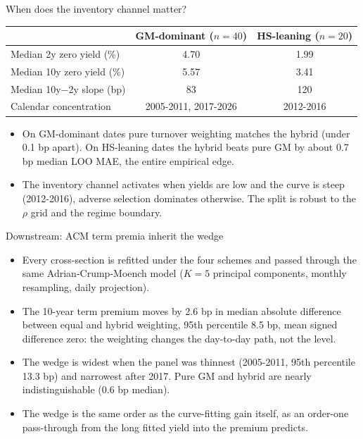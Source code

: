 \documentclass[aspectratio=169,11pt]{beamer}
\begin{document}
\begin{frame}{When does the inventory channel matter?}
  \begin{center}
  \small
  \begin{tabular}{lcc}
  \toprule
  & GM-dominant ($n=40$) & HS-leaning ($n=20$) \\
  \midrule
  Median 2y zero yield (\%)   & 4.70 & 1.99 \\
  Median 10y zero yield (\%)  & 5.57 & 3.41 \\
  Median 10y$-$2y slope (bp)  & 83   & 120  \\
  Calendar concentration      & 2005-2011, 2017-2026 & 2012-2016 \\
  \bottomrule
  \end{tabular}
  \end{center}
  \vspace{2mm}
  \begin{itemize}
    \item On GM-dominant dates pure turnover weighting matches the hybrid
          (under 0.1 bp apart). On HS-leaning dates the hybrid beats pure GM
          by about 0.7 bp median LOO MAE, the entire empirical edge.
    \item The inventory channel activates when yields are low and the curve
          is steep (2012-2016), adverse selection dominates otherwise. The
          split is robust to the $\rho$ grid and the regime boundary.
  \end{itemize}
\end{frame}

\begin{frame}{Downstream: ACM term premia inherit the wedge}
  \begin{itemize}
    \item Every cross-section is refitted under the four schemes and passed
          through the same Adrian-Crump-Moench model ($K=5$ principal
          components, monthly resampling, daily projection).
    \item The 10-year term premium moves by 2.6 bp in median absolute
          difference between equal and hybrid weighting, 95th percentile
          8.5 bp, mean signed difference zero: the weighting changes the
          day-to-day path, not the level.
    \item The wedge is widest when the panel was thinnest (2005-2011, 95th
          percentile 13.3 bp) and narrowest after 2017. Pure GM and hybrid
          are nearly indistinguishable (0.6 bp median).
    \item The wedge is the same order as the curve-fitting gain itself, as an
          order-one pass-through from the long fitted yield into the premium
          predicts.
  \end{itemize}
\end{frame}
\end{document}
